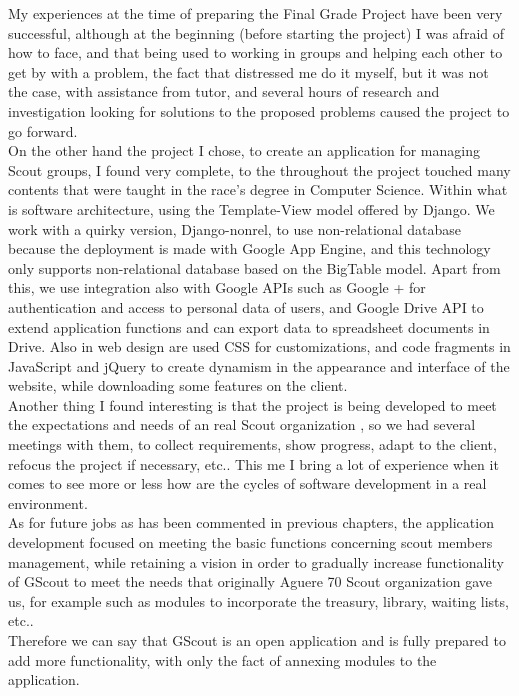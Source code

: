 

My experiences at the time of preparing the Final Grade Project have been very successful, although at the beginning
(before starting the project) I was afraid of how to face, and that being used to working in groups and helping
each other to get by with a problem, the fact that distressed me do it myself, but it was not the case, with assistance from
tutor, and several hours of research and investigation looking for solutions to the proposed problems caused the project to go forward.\\

On the other hand the project I chose, to create an application for managing Scout groups, I found very complete, to the
throughout the project touched many contents that were taught in the race's degree in Computer Science. Within what is
software architecture, using the Template-View model offered by Django. We work with a quirky version,
Django-nonrel, to use non-relational database because the deployment is made with Google App Engine, and this technology
only supports non-relational database based on the BigTable model. Apart from this, we use integration also
with Google APIs such as Google + for authentication and access to personal data of users, and Google Drive API to extend
application functions and can export data to spreadsheet documents in Drive. Also in web design are used
CSS for customizations, and code fragments in JavaScript and jQuery to create dynamism in the appearance and interface of the website,
while downloading some features on the client.\\

Another thing I found interesting is that the project is being developed to meet the expectations and needs of an real Scout organization
, so we had several meetings with them, to collect requirements, show progress, adapt to the client,
refocus the project if necessary, etc.. This me I bring a lot of experience when it comes to see more or less how are the cycles of
software development in a real environment.\\

As for future jobs as has been commented in previous chapters, the application development focused on meeting the basic functions
concerning scout members management, while retaining a vision in order to gradually increase functionality of GScout
to meet the needs that originally Aguere 70 Scout organization gave us, for example such as modules to incorporate the treasury, library, waiting lists, etc..\\

Therefore we can say that GScout is an open application and is fully prepared to add more functionality, with only the fact of annexing
modules to the application.


